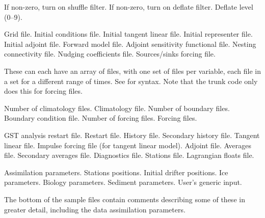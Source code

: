 \begin{klist}
     \begin{klist}
           If non-zero, turn on shuffle filter.
           If non-zero, turn on deflate filter.
           Deflate level (0--9).
     \end{klist}
    \mbox{}
     \begin{klist}
         Grid file.
         Initial conditions file.
         Initial tangent linear file.
         Initial representer file.
         Initial adjoint file.
         Forward model file.
         Adjoint sensitivity functional file.
         Nesting connectivity file.
         Nudging coefficients file.
         Sources/sinks forcing file.
     \end{klist}
     These can
each have an array of files, with one set of files per variable,
each file in a set for a different range of times. See
 for syntax. Note that the trunk code only does this
for forcing files.
     \begin{klist}
         Number of climatology files.
         Climatology file.
         Number of boundary files.
         Boundary condition file.
         Number of forcing files.
         Forcing files.
     \end{klist}
     \mbox{}
     \begin{klist}
         GST analysis restart file.
         Restart file.
         History file.
        Secondary history file.
         Tangent linear file.
         Impulse forcing file (for tangent linear model).
         Adjoint file.
         Averages file.
        Secondary averages file.
         Diagnostics file.
         Stations file.
         Lagrangian floats file.
     \end{klist}
    \mbox{}
     \begin{klist}
         Assimilation parameters.
         Stations positions.
         Initial drifter positions.
         Ice parameters.
         Biology parameters.
         Sediment parameters.
         User's generic input.
     \end{klist}
\end{klist}
The bottom of the sample files contain comments describing some of these in
greater detail, including the data assimilation parameters.

